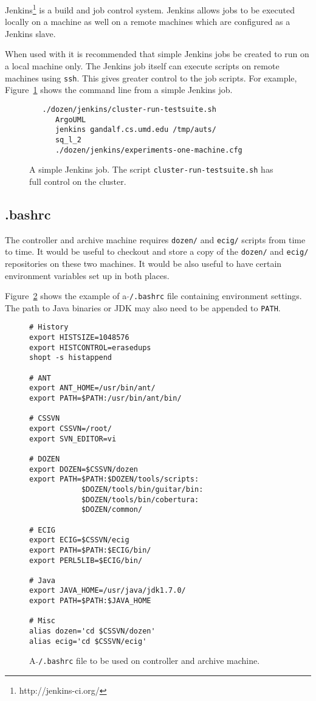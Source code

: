 Jenkins\footnote{http://jenkins-ci.org/} is a build and job control system. Jenkins allows jobs to be executed locally on a machine as well on a remote machines which are configured as a Jenkins slave.

When used with \mddozen{} it is recommended that simple Jenkins jobs be created to run on a local machine only. The Jenkins job itself can execute scripts on remote machines using \texttt{ssh}. This gives greater control to the job scripts. For example, Figure~\ref{fig:jenkinsjob} shows the command line from a simple Jenkins job.


\begin{figure}
   \scriptsize{
   \begin{lstlisting}
   ./dozen/jenkins/cluster-run-testsuite.sh
      ArgoUML
      jenkins gandalf.cs.umd.edu /tmp/auts/
      sq_l_2
      ./dozen/jenkins/experiments-one-machine.cfg
   \end{lstlisting}
   }

   \caption{A simple Jenkins job. The script \texttt{cluster-run-testsuite.sh} has full control on the cluster.}
   \label{fig:jenkinsjob}
\end{figure}


\subsection{.bashrc}
\label{sec:bashrc}

The controller and archive machine requires \texttt{dozen/} and \texttt{ecig/} scripts from time to time. It would be useful to checkout and store a copy of the \texttt{dozen/} and \texttt{ecig/} repositories on these two machines. It would be also useful to have certain environment variables set up in both places.

Figure~\ref{fig:bashrc} shows the example of a \texttt{$\tilde{}$/.bashrc} file containing environment settings. The path to Java binaries or JDK may also need to be appended to \texttt{PATH}.


\begin{figure}
   \scriptsize{
   \begin{lstlisting}
# History
export HISTSIZE=1048576
export HISTCONTROL=erasedups
shopt -s histappend

# ANT
export ANT_HOME=/usr/bin/ant/
export PATH=$PATH:/usr/bin/ant/bin/

# CSSVN
export CSSVN=/root/
export SVN_EDITOR=vi

# DOZEN
export DOZEN=$CSSVN/dozen
export PATH=$PATH:$DOZEN/tools/scripts:
            $DOZEN/tools/bin/guitar/bin:
            $DOZEN/tools/bin/cobertura:
            $DOZEN/common/

# ECIG
export ECIG=$CSSVN/ecig
export PATH=$PATH:$ECIG/bin/
export PERL5LIB=$ECIG/bin/

# Java
export JAVA_HOME=/usr/java/jdk1.7.0/
export PATH=$PATH:$JAVA_HOME

# Misc
alias dozen='cd $CSSVN/dozen'
alias ecig='cd $CSSVN/ecig'
   \end{lstlisting}
   }

   \caption{A \texttt{$\tilde{}$/.bashrc} file to be used on controller and archive machine.}
   \label{fig:bashrc}
\end{figure}

